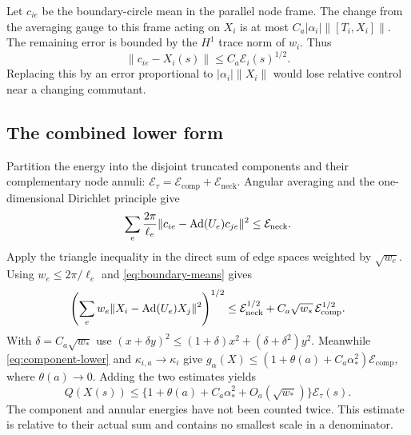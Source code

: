 Let $c_{ie}$ be the boundary-circle mean in the parallel node
frame. The change from the averaging gauge to this frame
acting on $X_i$ is at most
$C_a|\alpha_i|\|[T_i,X_i]\|$. The remaining error is bounded
by the $H^1$ trace norm of $w_i$. Thus
\begin{equation}\label{eq:boundary-means}
 \|c_{ie}-X_i(s)\|\le C_a\mathcal E_i(s)^{1/2}.
\end{equation}
Replacing this by an error proportional to
$|\alpha_i|\|X_i\|$ would lose relative control near a
changing commutant.

\subsection{The combined lower form}
Partition the energy into the disjoint truncated components
and their complementary node annuli:
$\mathcal E_\tau=\mathcal E_{\mathrm{comp}}
                  +\mathcal E_{\mathrm{neck}}$.
Angular averaging and the one-dimensional Dirichlet principle
give
\[
 \sum_e\frac{2\pi}{\ell_e}
       \|c_{ie}-\operatorname{Ad}(U_e)c_{je}\|^2
                   \le\mathcal E_{\mathrm{neck}}.
\]
Apply the triangle inequality in the direct sum of edge
spaces weighted by $\sqrt{w_e}$. Using
$w_e\le2\pi/\ell_e$ and \eqref{eq:boundary-means} gives
\begin{equation}\label{eq:weighted-neck-lower}
 \left(\sum_e w_e\|X_i-\operatorname{Ad}(U_e)X_j\|^2\right)^{1/2}
 \le\mathcal E_{\mathrm{neck}}^{1/2}
           +C_a\sqrt{w_*}\,\mathcal E_{\mathrm{comp}}^{1/2}.
\end{equation}
With $\delta=C_a\sqrt{w_*}$ use
$(x+\delta y)^2\le(1+\delta)x^2+(\delta+\delta^2)y^2$.
Meanwhile \eqref{eq:component-lower} and
$\kappa_{i,a}\to\kappa_i$ give
$g_\alpha(X)\le(1+\theta(a)+C_a\alpha_*^2)
                   \mathcal E_{\mathrm{comp}}$, where
$\theta(a)\to0$. Adding the two estimates yields
\begin{equation}\label{eq:combined-form-lower}
 Q(X(s))\le
   \{1+\theta(a)+C_a\alpha_*^2+O_a(\sqrt{w_*})\}
                                    \mathcal E_\tau(s).
\end{equation}
The component and annular energies have not been counted
twice. This estimate is relative to their actual sum and
contains no smallest scale in a denominator.

